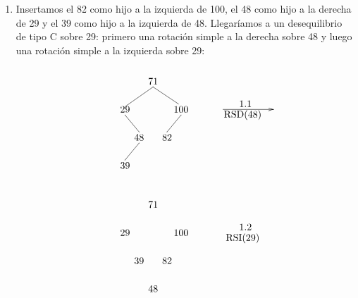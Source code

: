 \documentclass[10pt,a4paper,spanish]{report}
\begin{document}
\begin{enumerate}
      \item Insertamos el 82 como hijo a la izquierda de 100, el 48 como hijo a la derecha de 29 y el 39 como hijo a la izquierda de 48. Llegaríamos a un desequilibrio de tipo C sobre 29: primero una rotación simple a la derecha sobre 48 y luego una rotación simple a la izquierda sobre 29:

      \begin{minipage}{0.5\textwidth}
      \[\begin{xy}
      ,(33,-8)*+=<10mm>[]\txt<2cm>{1.1}
      ,(32,-12)*+=<20mm>[]\txt<2cm>{RSD(48)}
      ,(0,0)*+=<10mm>[]\txt<2cm>{71}
      ,(-10,-10)*+=<10mm>[]\txt<2cm>{29}
      ,(10,-10)*+=<10mm>[]\txt<2cm>{100}
      ,(-5,-20)*+=<10mm>[]\txt<2cm>{48}
      ,(5,-20)*+=<10mm>[]\txt<2cm>{82}
      ,(-10,-30)*+=<10mm>[]\txt<2cm>{39}

      \ar@{->} (25,-10);(43,-10)
      \ar@{-} (0,-2);(-10,-9) %
      \ar@{-} (0,-2);(9,-8) %
      \ar@{-} (10,-12);(5,-18)
      \ar@{-} (-10,-12);(-5,-18)
      \ar@{-} (-5,-22);(-10,-28) 
      \end{xy}\]
      \end{minipage}
      \begin{minipage}{0.5\textwidth}
      \[\begin{xy}
      ,(33,-8)*+=<10mm>[]\txt<2cm>{1.2}
      ,(32,-12)*+=<20mm>[]\txt<2cm>{RSI(29)}
      ,(0,0)*+=<10mm>[]\txt<2cm>{71}
      ,(-10,-10)*+=<10mm>[]\txt<2cm>{29}
      ,(10,-10)*+=<10mm>[]\txt<2cm>{100}
      ,(-5,-20)*+=<10mm>[]\txt<2cm>{39}
      ,(5,-20)*+=<10mm>[]\txt<2cm>{82}
      ,(0,-30)*+=<10mm>[]\txt<2cm>{48}


\end{xy}\]
\end{minipage}
\end{enumerate}
\end{document}
